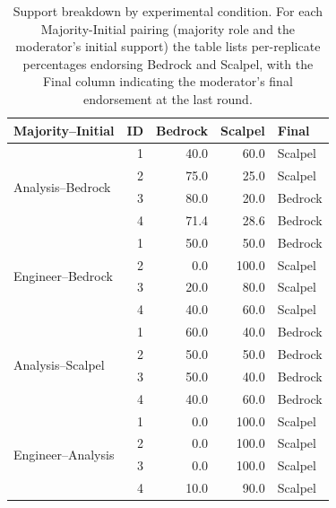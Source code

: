\documentclass[11pt, letterpaper, shortlabels]{berkeley}
\begin{document}
{\begin{table}
\vspace{-6pt}
\centering
\caption{Support breakdown by experimental condition. For each Majority-Initial pairing (majority role and the moderator’s initial support) the table lists per-replicate percentages endorsing Bedrock and Scalpel, with the Final column indicating the moderator’s final endorsement at the last round.}
\label{tab:support_analysis}
\footnotesize
\begin{tabular}{lrrrl}
\toprule
\textbf{Majority--Initial} & \textbf{ID} & \textbf{Bedrock} & \textbf{Scalpel} & \textbf{Final} \\
\midrule
\multirow{4}{*}{Analysis--Bedrock}  & 1 & 40.0 & 60.0 & Scalpel \\
                                    & 2 & 75.0 & 25.0 & Scalpel \\
                                    & 3 & 80.0 & 20.0 & Bedrock \\
                                    & 4 & 71.4 & 28.6 & Bedrock \\
\midrule
\multirow{4}{*}{Engineer--Bedrock}  & 1 & 50.0 & 50.0 & Bedrock \\
                                    & 2 & 0.0  & 100.0& Scalpel \\
                                    & 3 & 20.0 & 80.0 & Scalpel \\
                                    & 4 & 40.0 & 60.0 & Scalpel \\
\midrule
\multirow{4}{*}{Analysis--Scalpel}  & 1 & 60.0 & 40.0 & Bedrock \\
                                    & 2 & 50.0 & 50.0 & Bedrock \\
                                    & 3 & 50.0 & 40.0 & Bedrock \\
                                    & 4 & 40.0 & 60.0 & Bedrock \\
\midrule
\multirow{4}{*}{Engineer--Analysis}  & 1 & 0.0  & 100.0& Scalpel \\
                                    & 2 & 0.0  & 100.0& Scalpel \\
                                    & 3 & 0.0  & 100.0& Scalpel \\
                                    & 4 & 10.0 & 90.0 & Scalpel \\
\bottomrule
\end{tabular}
\vspace{-8pt}
\end{table}


}
\end{document}
